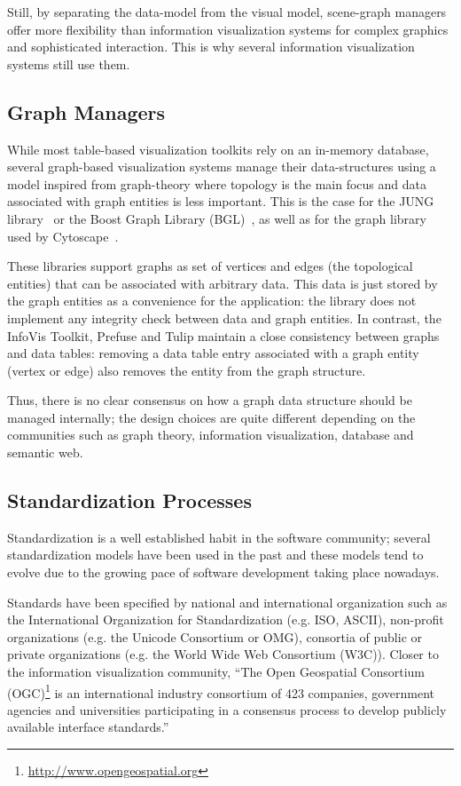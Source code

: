 Still, by separating the data-model from the visual model, scene-graph
managers offer more flexibility than information visualization systems
for complex graphics and sophisticated interaction.  This is why
several information visualization systems still use them.


\subsection{Graph Managers}


While most table-based visualization toolkits rely on an in-memory
database, several graph-based visualization systems manage their
data-structures using a model inspired from graph-theory where
topology is the main focus and data associated with graph entities is
less important.  This is the case for the JUNG library~\cite{jung2003}
or the Boost Graph Library (BGL)~\cite{BGL}, as well as for the graph
library used by Cytoscape~\cite{Cytoscape}.

These libraries support graphs as set of vertices and edges (the
topological entities) that can be associated with arbitrary data.
This data is just stored by the graph entities as a convenience for
the application: the library does not implement any integrity check
between data and graph entities.  In contrast, the InfoVis Toolkit,
Prefuse and Tulip maintain a close consistency between graphs and data
tables: removing a data table entry associated with a graph entity
(vertex or edge) also removes the entity from the graph structure.

Thus, there is no clear consensus on how a graph data structure should
be managed internally; the design choices are quite different
depending on the communities such as graph theory, information
visualization, database and semantic web.


\subsection{Standardization Processes}

Standardization is a well established habit in the software community;
several standardization models have been used in the past and these
models tend to evolve due to the growing pace of software development
taking place nowadays.

Standards have been specified by national and international
organization such as the International Organization for
Standardization (e.g. ISO, ASCII), non-profit organizations (e.g. the
Unicode Consortium or OMG), consortia of public or private
organizations (e.g. the World Wide Web Consortium (W3C)). Closer to
the information visualization community, ``The Open Geospatial
Consortium (OGC)\footnote{\url{http://www.opengeospatial.org}} is an
international industry consortium of 423 companies, government
agencies and universities participating in a consensus process to
develop publicly available interface standards.''

